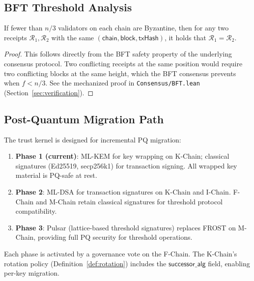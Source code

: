 \subsection{BFT Threshold Analysis}

\begin{theorem}\label{thm:safety}
If fewer than $n/3$ validators on each chain are Byzantine, then for any
two receipts $\mathcal{R}_1, \mathcal{R}_2$ with the same
$(\mathsf{chain}, \mathsf{block}, \mathsf{txHash})$, it holds that
$\mathcal{R}_1 = \mathcal{R}_2$.
\end{theorem}

\begin{proof}
This follows directly from the BFT safety property of the underlying consensus
protocol. Two conflicting receipts at the same position would require two
conflicting blocks at the same height, which the BFT consensus prevents
when $f < n/3$. See the mechanized proof in \texttt{Consensus/BFT.lean}
(Section~\ref{sec:verification}).
\end{proof}

\subsection{Post-Quantum Migration Path}

The trust kernel is designed for incremental PQ migration:

\begin{enumerate}
    \item \textbf{Phase 1 (current)}: ML-KEM for key wrapping on K-Chain;
          classical signatures (Ed25519, secp256k1) for transaction signing.
          All wrapped key material is PQ-safe at rest.
    \item \textbf{Phase 2}: ML-DSA for transaction signatures on K-Chain and
          I-Chain. F-Chain and M-Chain retain classical signatures for
          threshold protocol compatibility.
    \item \textbf{Phase 3}: Pulsar (lattice-based threshold signatures)
          replaces FROST on M-Chain, providing full PQ security for threshold
          operations.
\end{enumerate}

Each phase is activated by a governance vote on the F-Chain. The K-Chain's
rotation policy (Definition~\ref{def:rotation}) includes the
$\mathsf{successor\_alg}$ field, enabling per-key migration.

